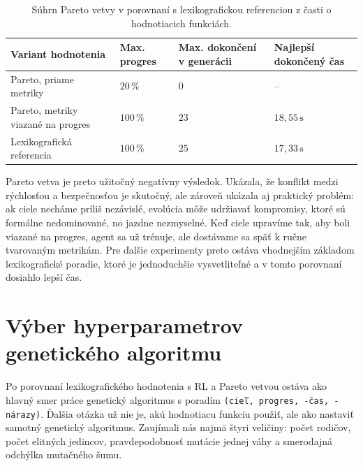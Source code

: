 \begin{table}[htbp]
    \centering
    \small
    \renewcommand{\arraystretch}{1.12}
    \caption[Súhrn Pareto vetvy]{Súhrn Pareto vetvy v porovnaní s lexikografickou referenciou z časti o hodnotiacich funkciách.}
    \label{tab:pareto_moo_summary}
    \begin{tabular}{>{\raggedright\arraybackslash}p{}
                    >{\centering\arraybackslash}p{}
                    >{\centering\arraybackslash}p{}
                    >{\centering\arraybackslash}p{}}
        \toprule
        Variant hodnotenia & Max. progres & Max. dokončení v generácii & Najlepší dokončený čas \\
        \midrule
        Pareto, priame metriky & \(20\,\%\) & \(0\) & -- \\
        Pareto, metriky viazané na progres & \(100\,\%\) & \(23\) & \(18{,}55\,\mathrm{s}\) \\
        Lexikografická referencia & \(100\,\%\) & \(25\) & \(17{,}33\,\mathrm{s}\) \\
        \bottomrule
    \end{tabular}
\end{table}

Pareto vetva je preto užitočný negatívny výsledok. Ukázala, že konflikt medzi rýchlosťou a bezpečnosťou je skutočný, ale zároveň ukázala aj praktický problém: ak ciele necháme príliš nezávislé, evolúcia môže udržiavať kompromisy, ktoré sú formálne nedominované, no jazdne nezmyselné. Keď ciele upravíme tak, aby boli viazané na progres, agent sa už trénuje, ale dostávame sa späť k ručne tvarovaným metrikám. Pre ďalšie experimenty preto ostáva vhodnejším základom lexikografické poradie, ktoré je jednoduchšie vysvetliteľné a v tomto porovnaní dosiahlo lepší čas.

\FloatBarrier

\section{Výber hyperparametrov genetického algoritmu}

Po porovnaní lexikografického hodnotenia s RL a Pareto vetvou ostáva ako hlavný smer práce genetický algoritmus s poradím \texttt{(cieľ, progres, -čas, -nárazy)}. Ďalšia otázka už nie je, akú hodnotiacu funkciu použiť, ale ako nastaviť samotný genetický algoritmus. Zaujímali nás najmä štyri veličiny: počet rodičov, počet elitných jedincov, pravdepodobnosť mutácie jednej váhy a smerodajná odchýlka mutačného šumu.

